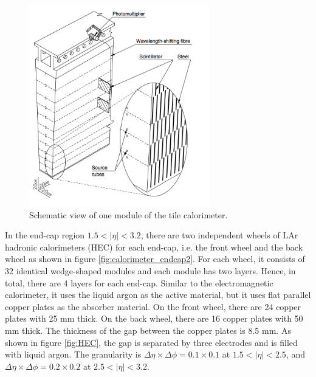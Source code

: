 \begin{figure}
\centering
\includegraphics[width=0.7\textwidth]{data/photo/detector/tile.png}
\caption{Schematic view of one module of the tile calorimeter. \cite{ATLAS_doc}}
\label{fig:tile_calorimeter}
\end{figure}

In the end-cap region $1.5 < |\eta| < 3.2$, there are two independent wheels of LAr hadronic calorimeters (HEC) for each end-cap, i.e. the front wheel and the back wheel as shown in figure \ref{fig:calorimeter_endcap2}.
For each wheel, it consists of 32 identical wedge-shaped modules and each module has two layers.
Hence, in total, there are 4 layers for each end-cap.
Similar to the electromagnetic calorimeter, it uses the liquid argon as the active material, but it uses flat parallel copper plates as the absorber material.
On the front wheel, there are 24 copper plates with 25 mm thick.
On the back wheel, there are 16 copper plates with 50 mm thick.
The thickness of the gap between the copper plates is 8.5 mm.
As shown in figure \ref{fig:HEC}, the gap is separated by three electrodes and is filled with liquid argon.
The granularity is $\Delta \eta \times \Delta \phi = 0.1 \times 0.1$ at $1.5 < |\eta| < 2.5$, and $\Delta \eta \times \Delta \phi = 0.2 \times 0.2$ at $2.5 < |\eta| < 3.2$.

